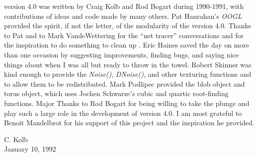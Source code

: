 {\Rayshade} version 4.0
was written by Craig Kolb and Rod Bogart during 1990-1991, with contributions
of ideas and code made by many others.
Pat Hanrahan's {\em OOGL} provided the spirit, if not the letter, of the
modularity of the version 4.0.  Thanks to Pat and to Mark VandeWettering
for the ``net tracer'' conversations and for the inspiration to do something
to clean up {\rayshade}.
Eric Haines saved the day on more than one occasion by suggesting
improvements, finding bugs, and saying nice things about {\rayshade}
when I was all but ready to throw in the towel.
Robert Skinner was kind enough to provide the {\em Noise()}, {\em DNoise()},
and other texturing functions and to allow them to be redistributed.
Mark Podlipec provided the blob object and torus object, which uses
Jochen Schwarze's cubic and quartic root-finding functions.
Major Thanks to Rod Bogart for being willing to take the plunge and
play such a large role in the development of version 4.0.
I am most grateful to Benoit Mandelbrot for his support of this
project and the inspiration he provided.

\begin{flushright}
\parbox[t]{1.5in}{
C. Kolb \\
January 10, 1992
}
\end{flushright}
